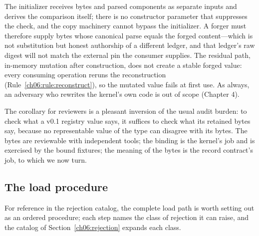 \begin{designargument}
The initializer receives bytes and parsed components as separate inputs
and derives the comparison itself; there is no constructor parameter that
suppresses the check, and the copy machinery cannot bypass the
initializer. A forger must therefore supply bytes whose canonical parse
equals the forged content---which is not substitution but honest
authorship of a different ledger, and that ledger's raw digest will not
match the external pin the consumer supplies. The residual path,
in-memory mutation after construction, does not create a stable forged
value: every consuming operation reruns the reconstruction
(Rule~\ref{ch06:rule:reconstruct}), so the mutated value fails at first
use. As always, an adversary who rewrites the kernel's own code is out of
scope (Chapter 4).
\end{designargument}

The corollary for reviewers is a pleasant inversion of the usual audit
burden: to check what a v0.1 registry value says, it suffices to check
what its retained bytes say, because no representable value of the type
can disagree with its bytes. The bytes are reviewable with independent
tools; the binding is the kernel's job and is exercised by the bound
fixtures; the meaning of the bytes is the record contract's job, to which
we now turn.

\subsection{The load procedure}

For reference in the rejection catalog, the complete load path is worth
setting out as an ordered procedure; each step names the class of
rejection it can raise, and the catalog of Section~\ref{ch06:rejection}
expands each class.


